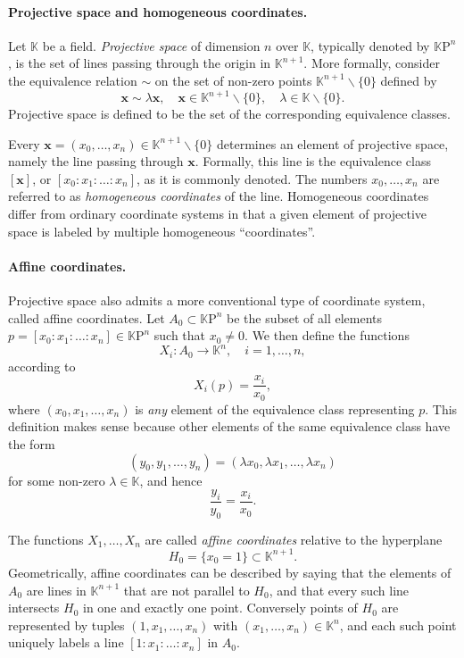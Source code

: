 \documentclass{article}
\newcommand{\kf}{\mathbb{K}}
\newcommand{\KP}{{\mathbb{K}\mathrm{P}}}
\newcommand{\bx}{\mathbf{x}}
\newcommand{\nzkn}{\kf^{n+1}\backslash \{0\}}
\begin{document}
\paragraph{Projective space and homogeneous coordinates.}
Let $\kf$ be a field.  {\em Projective space} of dimension $n$ over
$\kf$, typically denoted by $\KP^n$, is the set of lines passing
through the origin in $\kf^{n+1}$.  More formally, consider the
equivalence relation $\sim$ on the set of non-zero points $\nzkn$
defined by
$$\bx \sim \lambda \bx,\quad \bx\in \nzkn,\quad \lambda \in
\kf\backslash\{0\}.$$
Projective space is defined to be the set of the
corresponding equivalence classes.

Every $\bx=(x_0,\ldots,x_n)\in\nzkn$ determines an element of
projective space, namely the line passing through $\bx$. Formally,
this line is the equivalence class $[\bx]$, or $[x_0:x_1:\ldots:x_n]$,
as it is commonly denoted. The numbers $x_0,\ldots,x_n$ are referred
to as \emph{homogeneous coordinates} of the line.  Homogeneous coordinates
differ from ordinary coordinate systems in that a given element of
projective space is labeled by multiple homogeneous ``coordinates''.

\paragraph{Affine coordinates.} Projective space also admits a more
conventional type of coordinate system, called affine coordinates.
Let $A_0\subset\KP^n$ be the subset of all elements
$p=[x_0:x_1:\ldots:x_n]\in\KP^n$ such that $x_0\neq 0$.  We then
define the functions
$$X_i:A_0\rightarrow \kf^n,\quad i=1,\ldots,n,$$
according to
$$X_i(p) = \frac{x_i}{x_0},$$
where $(x_0,x_1,\ldots,x_n)$ is {\em
  any} element of the equivalence class representing $p$. This
definition makes sense because other elements of the same equivalence
class have the form
$$(y_0,y_1,\ldots,y_n)=(\lambda x_0,\lambda x_1,\ldots,\lambda x_n)$$
for some non-zero $\lambda\in\kf$, and hence 
$$\frac{y_i}{y_0} = \frac{x_i}{x_0}.$$

The functions $X_1,\ldots,X_n$ are called \emph{affine coordinates} relative
to the hyperplane $$H_0=\{x_0=1\}\subset\kf^{n+1}.$$
Geometrically,
affine coordinates can be described by saying that the elements of
$A_0$ are lines in $\kf^{n+1}$ that are not parallel to $H_0$, and
that every such line intersects $H_0$ in one and exactly one point.
Conversely points of $H_0$ are represented by tuples
$(1,x_1,\ldots,x_n)$ with $(x_1,\ldots,x_n)\in\kf^n$, and each such
point uniquely labels a line $[1:x_1:\ldots:x_n]$ in $A_0$.  
\end{document}
